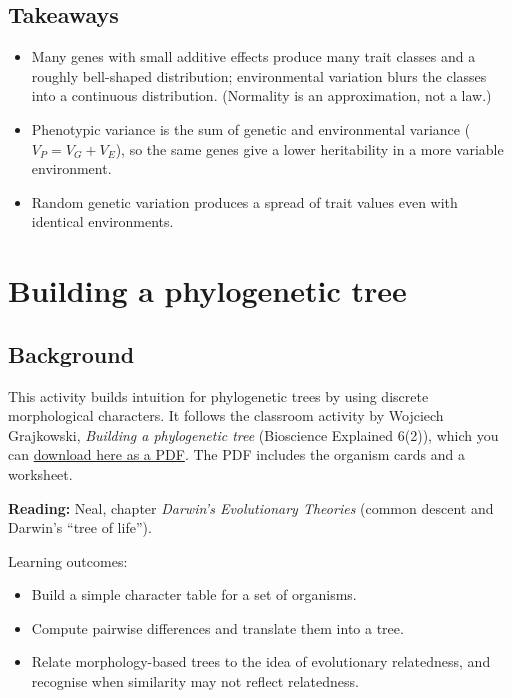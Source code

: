 \documentclass[
  a4paper]{book}
\providecommand{\tightlist}{%
  \setlength{\itemsep}{0pt}\setlength{\parskip}{0pt}}
\begin{document}
\section{Takeaways}\label{takeaways-25}

\begin{itemize}
\tightlist
\item
  Many genes with small additive effects produce many trait classes and a roughly bell-shaped distribution; environmental variation blurs the classes into a continuous distribution. (Normality is an approximation, not a law.)
\item
  Phenotypic variance is the sum of genetic and environmental variance (\(V_P = V_G + V_E\)), so the same genes give a lower heritability in a more variable environment.
\item
  Random genetic variation produces a spread of trait values even with identical environments.
\end{itemize}

\chapter{Building a phylogenetic tree}\label{building-a-phylogenetic-tree}

\section{Background}\label{background-22}

This activity builds intuition for phylogenetic trees by using discrete morphological characters. It follows the classroom activity by Wojciech Grajkowski, \emph{Building a phylogenetic tree} (Bioscience Explained 6(2)), which you can \href{https://github.com/jonesor/BB512_Book/raw/main/supplemental/Macroevolution_Building_A_Tree/FylTree_ENG_2015.pdf}{download here as a PDF}. The PDF includes the organism cards and a worksheet.

\textbf{Reading:} Neal, chapter \emph{Darwin's Evolutionary Theories} (common descent and Darwin's ``tree of life'').

Learning outcomes:

\begin{itemize}
\tightlist
\item
  Build a simple character table for a set of organisms.
\item
  Compute pairwise differences and translate them into a tree.
\item
  Relate morphology-based trees to the idea of evolutionary relatedness, and recognise when similarity may not reflect relatedness.
\end{itemize}
\end{document}
